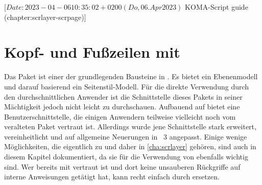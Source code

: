 %
%
%
%
%
%
%

%
                 [$Date: 2023-04-06 10:35:02 +0200 (Do, 06. Apr 2023) $
                  KOMA-Script guide (chapter:scrlayer-scrpage)]

\chapter[{Kopf- und Fußzeilen mit \Package{scrlayer-scrpage}}]
  {Kopf- und Fußzeilen mit
    }
%
\BeginIndexGroup%
%
Das Paket \hyperref[cha:scrlayer]{}%
%
 ist einer der grundlegenden Bausteine in
\KOMAScript{}. Es bietet ein Ebenenmodell und darauf basierend ein
Seitenstil-Modell. Für die direkte Verwendung durch den durchschnittlichen
Anwender ist die Schnittstelle dieses Pakets in seiner Mächtigkeit jedoch
nicht leicht zu durchschauen.  Aufbauend auf
\hyperref[cha:scrlayer]{} bietet
 eine
Benutzerschnittstelle, die einigen Anwendern teilweise vielleicht noch vom
veralteten Paket
vertraut ist. Allerdings wurde jene Schnittstelle stark erweitert,
vereinheitlicht und auf allgemeine Neuerungen in \KOMAScript~3 angepasst.
Einige wenige Möglichkeiten, die eigentlich zu
\hyperref[cha:scrlayer]{} und daher in
\autoref{cha:scrlayer} gehören, sind auch in diesem Kapitel dokumentiert, da
sie für die Verwendung von  ebenfalls wichtig
sind. Wer bereits mit  vertraut ist und dort keine
unsauberen Rückgriffe auf interne Anweisungen getätigt hat, kann %
\iffalse in der Regel \fi%
 recht einfach durch  ersetzen.

